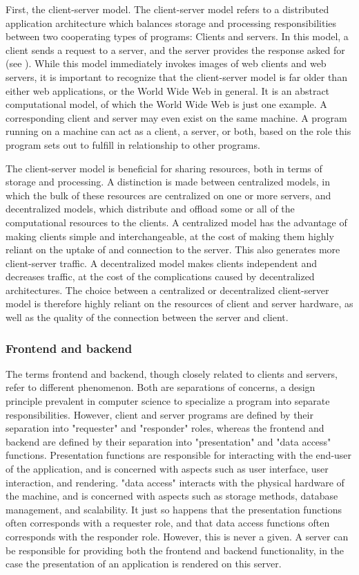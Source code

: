 First, the client-server model. 
The client-server model refers to a distributed application architecture which balances storage and processing responsibilities between two cooperating types of programs: 
Clients and servers.
In this model, a client sends a request to a server, and the server provides the response asked for (see ).
While this model immediately invokes images of web clients and web servers, it is important to recognize that the client-server model is far older than either web applications, or the World Wide Web in general. 
It is an abstract computational model, of which the World Wide Web is just one example.
A corresponding client and server may even exist on the same machine. 
A program running on a machine can act as a client, a server, or both, based on the role this program sets out to fulfill in relationship to other programs. 

The client-server model is beneficial for sharing resources, both in terms of storage and processing. 
A distinction is made between centralized models, in which the bulk of these resources are centralized on one or more servers, and decentralized models, which distribute and offload some or all of the computational resources to the clients. 
A centralized model has the advantage of making clients simple and interchangeable, at the cost of making them highly reliant on the uptake of and connection to the server. This also generates more client-server traffic. 
A decentralized model makes clients independent and decreases traffic, at the cost of the complications caused by decentralized architectures. 
The choice between a centralized or decentralized client-server model is therefore highly reliant on the resources of client and server hardware, as well as the quality of the connection between the server and client.  

\subsubsection*{Frontend and backend}

The terms frontend and backend, though closely related to clients and servers, refer to different phenomenon. 
Both are separations of concerns, a design principle prevalent in computer science to specialize a program into separate responsibilities. 
However, client and server programs are defined by their separation into "requester" and "responder" roles, whereas the frontend and backend are defined by their separation into "presentation" and "data access" functions. 
Presentation functions are responsible for interacting with the end-user of the application, and is concerned with aspects such as user interface, user interaction, and rendering.
"data access" interacts with the physical hardware of the machine, and is concerned with aspects such as storage methods, database management, and scalability.  
It just so happens that the presentation functions often corresponds with a requester role,
and that data access functions often corresponds with the responder role.
However, this is never a given. 
A server can be responsible for providing both the frontend and backend functionality, in the case the presentation of an application is rendered on this server. 

